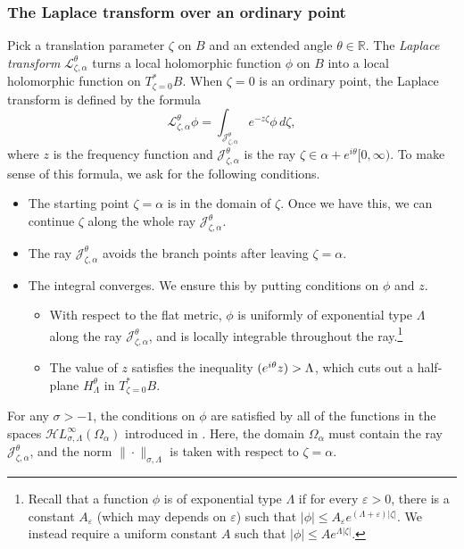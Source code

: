 \documentclass{article}
\let\Re\relax
\DeclareMathOperator{\Re}{Re}
\newcommand{\singexp}[2]{\mathcal{H}L^\infty_{#1, #2}}
\newcommand{\R}{\mathbb{R}}
\newcommand{\laplace}{\mathcal{L}}
\theoremstyle{definition}
\theoremstyle{plain}
\begin{document}
\subsubsection{The Laplace transform over an ordinary point}\label{laplace:ordinary}
%
Pick a translation parameter $\zeta$ on $B$ and an extended angle $\theta \in \R$. The {\em Laplace transform} $\laplace_{\zeta, \alpha}^\theta$ turns a local holomorphic function $\phi$ on $B$ into a local holomorphic function on $T^*_{\zeta = 0} B$. When $\zeta = 0$ is an ordinary point, the Laplace transform is defined by the formula
\begin{equation}\label{laplace:int}
\laplace_{\zeta, \alpha}^\theta \phi = \int_{\mathcal{J}_{\zeta, \alpha}^\theta} e^{-z\zeta} \phi\,d\zeta,
\end{equation}
where $z$ is the frequency function and $\mathcal{J}_{\zeta, \alpha}^\theta$ is the ray $\zeta \in \alpha + e^{i\theta} [0, \infty)$. To make sense of this formula, we ask for the following conditions.
\begin{itemize}
\item The starting point $\zeta = \alpha$ is in the domain of $\zeta$. Once we have this, we can continue $\zeta$ along the whole ray $\mathcal{J}_{\zeta, \alpha}^\theta$.
\item The ray $\mathcal{J}_{\zeta, \alpha}^\theta$ avoids the branch points after leaving $\zeta = \alpha$.
\item The integral converges. We ensure this by putting conditions on $\phi$ and $z$.
\begin{itemize}
\item With respect to the flat metric, $\phi$ is uniformly of exponential type $\Lambda$ along the ray $\mathcal{J}_{\zeta, \alpha}^\theta$, and is locally integrable throughout the ray.\footnote{Recall that a function $\phi$ is of exponential type $\Lambda$ if for every $\varepsilon>0$, there is a constant $A_\varepsilon$ (which may depends on $\varepsilon$) such that $|\phi|\le A_\varepsilon e^{(\Lambda+\varepsilon)|\zeta|}$. We instead require a uniform constant $A$ such that $|\phi| \le A e^{\Lambda|\zeta|}$.}
\item The value of $z$ satisfies the inequality $\Re(e^{i\theta} z) > \Lambda$, which cuts out a half-plane $H^\theta_\Lambda$ in $T^*_{\zeta = 0} B$.
\end{itemize}
\end{itemize}
For any $\sigma > -1$, the conditions on $\phi$ are satisfied by all of the functions in the spaces $\singexp{\sigma}{\Lambda}(\Omega_\alpha)$ introduced in \cite[Definition~2.3]{reg-sing-volterra}. Here, the domain $\Omega_\alpha$ must contain the ray $\mathcal{J}_{\zeta, \alpha}^\theta$, and the norm $\|\cdot\|_{\sigma, \Lambda}$ is taken with respect to $\zeta = \alpha$.
\end{document}
